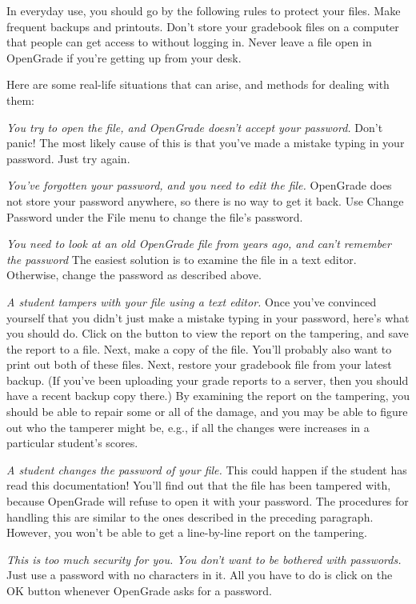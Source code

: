 \documentclass{opengrade_doc}
\begin{document}
In everyday use, you should go by the following rules to protect your
files. Make frequent
backups and printouts. Don't store your gradebook files on a computer
that people can get access to without logging in. Never leave a file
open in OpenGrade if you're getting up from your desk. 

Here are some
real-life situations that can arise, and methods for dealing with
them:

\emph{You try to open the file, and OpenGrade doesn't accept your password.\/}
Don't panic! The most likely cause of this is that you've made a mistake
typing in your password. Just try again.

\emph{You've forgotten your password, and you need to edit the file.\/}
OpenGrade does not store your password anywhere, so there is no
way to get it back.
Use Change Password under the File menu to change the file's password.

\emph{You need to look at an old OpenGrade file from years
ago, and can't remember the password}
The easiest solution is to examine the file in a text editor. Otherwise,
change the password as described above.

\emph{A student tampers with your file using a text editor.\/}
Once you've convinced yourself that you didn't just make a mistake typing
in your password, here's what you should do. Click on the button to view
the report on the tampering, and save the report to a file.
Next, make a copy of
the file. You'll probably also want to print out both of these files.
Next, restore your gradebook file from your latest backup. (If you've been uploading
your grade reports to a server, then you should have a recent backup copy
there.) By examining the report on the tampering, you should be able to
repair some or all of the damage, and you may be able to figure out who
the tamperer might be, e.g., if all the changes were increases in a
particular student's scores.

\emph{A student changes the password of your file.\/}
This could happen if the student has read this documentation! You'll find
out that the file has been tampered with, because OpenGrade will refuse to
open it with your password. The procedures for handling this are
similar to the ones described in the preceding paragraph. However, you won't
be able to get a line-by-line report on the tampering.

\emph{This is too much security for you.
You don't want to be bothered with passwords.\/}
Just use a password with no characters in it. All you have to do is
click on the OK button whenever OpenGrade asks for a password.
\end{document}
